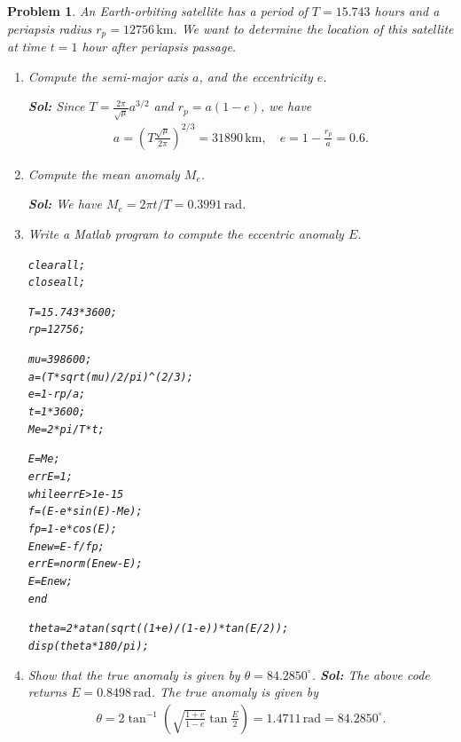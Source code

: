 \documentclass[10pt]{article}
\newcommand{\parenth}[1]{\ensuremath{\left( #1 \right)}}
\renewcommand{\baselinestretch}{1.2}
\theoremstyle{plain}\theorembodyfont{\normalfont}
\newtheorem{prob}{Problem}[section]
\newenvironment{subprob}%
{\renewcommand{\theenumi}{\alph{enumi}}\renewcommand{\labelenumi}{(\theenumi)}\begin{enumerate}}%
{\end{enumerate}}%
\newenvironment{matlab}
{\begin{alltt}\small\renewcommand{\baselinestretch}{1.2}\selectfont}%
{\end{alltt}}
\begin{document}
\begin{prob}
An Earth-orbiting satellite has a period of $T=15.743$ hours and a periapsis radius $r_p=12756\,\mathrm{km}$. We want to determine the location of this satellite at time $t=1$ hour after periapsis passage.
\begin{subprob}
\item Compute the semi-major axis $a$, and the eccentricity $e$.

\textbf{Sol:} Since $T = \frac{2\pi}{\sqrt{\mu}} a^{3/2}$ and $r_p = a(1-e)$, we have
\begin{align*}
a = \parenth{T\frac{\sqrt{\mu}}{2\pi}}^{2/3} = 31890\,\mathrm{km},\quad e=1-\frac{r_p}{a}=0.6.
\end{align*}

\item Compute the mean anomaly $M_e$.

\textbf{Sol:} We have $M_e = 2\pi t/T = 0.3991\,\mathrm{rad}$. 

\item Write a Matlab program to compute the eccentric anomaly $E$.

\begin{matlab}
clear all;
close all;

T=15.743*3600;
rp=12756;

mu=398600;
a=(T*sqrt(mu)/2/pi)^(2/3);
e=1-rp/a;
t=1*3600;
Me=2*pi/T*t;

E=Me;
errE=1;
while errE > 1e-15
    f=(E-e*sin(E)-Me);
    fp=1-e*cos(E);
    Enew=E-f/fp;
    errE=norm(Enew-E);
    E=Enew;
end

theta=2*atan(sqrt((1+e)/(1-e))*tan(E/2));
disp(theta*180/pi);
\end{matlab}
\item Show that the true anomaly is given by $\theta=84.2850^\circ$.
\textbf{Sol:} The above code returns $E=0.8498\,\mathrm{rad}$. The true anomaly is given by
\begin{align*}
\theta = 2\tan^{-1}\parenth{\sqrt{\frac{1+e}{1-e}}\tan\frac{E}{2}}=1.4711\,\mathrm{rad} = 84.2850^\circ.
\end{align*}
\end{subprob}
\end{prob}
\end{document}
